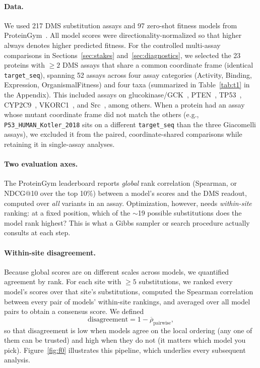 \documentclass{article}
\begin{document}
\paragraph{Data.} We used 217 DMS substitution assays and 97 zero-shot fitness models from ProteinGym~\citep{notin_proteingym_2023}. All model scores were directionality-normalized so that higher always denotes higher predicted fitness. For the controlled multi-assay comparisons in Sections~\ref{sec:stakes} and~\ref{sec:diagnostics}, we selected the 23 proteins with $\geq 2$ DMS assays that share a common coordinate frame (identical \texttt{target\_seq}), spanning 52 assays across four assay categories (Activity, Binding, Expression, OrganismalFitness) and four taxa (summarized in Table~\ref{tab:t1} in the Appendix). This included assays on glucokinase/GCK~\citep{gersing_comprehensive_2023,gersing_characterizing_2024}, PTEN~\citep{matreyek_integrating_2021,mighell_saturation_2018}, TP53~\citep{giacomelli_mutational_2018,kotler_systematic_2018}, CYP2C9~\citep{amorosi_massively_2021}, VKORC1~\citep{chiasson_multiplexed_2020}, and Src~\citep{ahler_integrated_2019,chakraborty_profiling_2024,nguyen_molecular_2023}, among others. When a protein had an assay whose mutant coordinate frame did not match the others (e.g., \texttt{P53\_HUMAN\_Kotler\_2018} sits on a different \texttt{target\_seq} than the three Giacomelli assays), we excluded it from the paired, coordinate-shared comparisons while retaining it in single-assay analyses.

\paragraph{Two evaluation axes.} The ProteinGym leaderboard reports \emph{global} rank correlation (Spearman, or NDCG@10 over the top 10\%) between a model's scores and the DMS readout, computed over \emph{all} variants in an assay. Optimization, however, needs \emph{within-site} ranking: at a fixed position, which of the $\sim$19 possible substitutions does the model rank highest? This is what a Gibbs sampler or search procedure actually consults at each step.

\paragraph{Within-site disagreement.} Because global scores are on different scales across models, we quantified agreement by rank. For each site with $\geq 5$ substitutions, we ranked every model's scores over that site's substitutions, computed the Spearman correlation between every pair of models' within-site rankings, and averaged over all model pairs to obtain a consensus score. We defined
\begin{equation}
  \text{disagreement} = 1 - \overline{\rho}_{\text{pairwise}},
\end{equation}
so that disagreement is low when models agree on the local ordering (any one of them can be trusted) and high when they do not (it matters which model you pick). Figure~\ref{fig:f0} illustrates this pipeline, which underlies every subsequent analysis.
\end{document}
